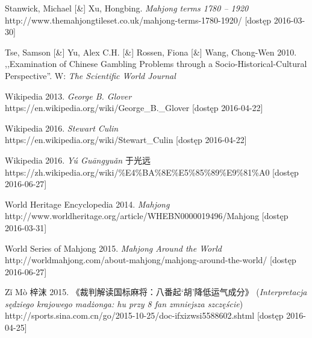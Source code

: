 Stanwick, Michael [\&] Xu, Hongbing. \textit{Mahjong terms 1780 – 1920}
\\http://www.themahjongtileset.co.uk/mahjong-terms-1780-1920/ [dostęp
2016-03-30]

Tse, Samson [\&] Yu, Alex C.H. [\&] Rossen, Fiona [\&] Wang, Chong-Wen
2010.
,,Examination of Chinese Gambling Problems through a Socio-Historical-Cultural Perspective''. W: \textit{The
Scientific World Journal}

Wikipedia 2013. \textit{George B. Glover}
\\https://en.wikipedia.org/wiki/George\_B.\_Glover [dostęp 2016-04-22]

Wikipedia 2016. \textit{Stewart Culin}
\\https://en.wikipedia.org/wiki/Stewart\_Culin [dostęp 2016-04-22]

Wikipedia 2016. \textit{Yú Guāngyuǎn} 于光远
\\https://zh.wikipedia.org/wiki/\%E4\%BA\%8E\%E5\%85\%89\%E9\%81\%A0 [dostęp
2016-06-27]

World Heritage Encyclopedia 2014. \textit{Mahjong}
\\http://www.worldheritage.org/article/WHEBN0000019496/Mahjong [dostęp
2016-03-31]

World Series of Mahjong 2015. \textit{Mahjong Around the World}
\\http://worldmahjong.com/about-mahjong/mahjong-around-the-world/ [dostęp
2016-06-27]

Zǐ Mò 梓沫 2015. 《裁判解读国标麻将：八番起‘胡’降低运气成分》
(\textit{Interpretacja sędziego krajowego madżonga:
hu przy 8 fan zmniejsza szczęście}) %
\\http://sports.sina.com.cn/go/2015-10-25/doc-ifxizwsi5588602.shtml [dostęp 2016-04-25]



